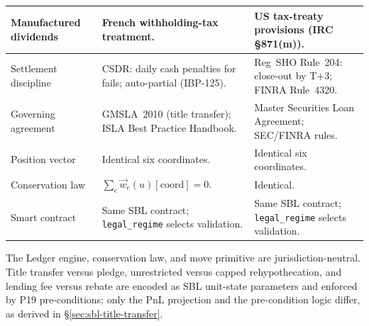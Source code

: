 \begin{center}
\begin{longtable}{p{3.2cm} p{5.2cm} p{5.2cm}}
\midrule
Manufactured dividends & French withholding-tax treatment. & US tax-treaty provisions (IRC \S871(m)). \\
\midrule
Settlement discipline & CSDR: daily cash penalties for fails; auto-partial (IBP-125). & Reg~SHO Rule~204: close-out by T+3; FINRA Rule~4320. \\
\midrule
Governing agreement & GMSLA~2010 (title transfer); ISLA Best Practice Handbook. & Master Securities Loan Agreement; SEC/FINRA rules. \\
\midrule
Position vector & Identical six coordinates. & Identical six coordinates. \\
\midrule
Conservation law & $\sum_e \vec{w}_e(u)[\text{coord}] = 0$. & Identical. \\
\midrule
Smart contract & Same SBL contract; \texttt{legal\_regime} selects validation. & Same SBL contract; \texttt{legal\_regime} selects validation. \\
\bottomrule
\end{longtable}
\end{center}

\noindent The Ledger engine, conservation law, and move primitive are jurisdiction-neutral. Title transfer versus pledge, unrestricted versus capped rehypothecation, and lending fee versus rebate are encoded as SBL unit-state parameters and enforced by P19 pre-conditions; only the PnL projection and the pre-condition logic differ, as derived in \S\ref{sec:sbl-title-transfer}.

